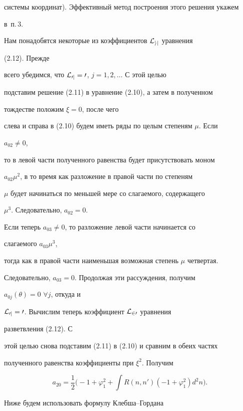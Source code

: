системы координат). Эффективный метод построения этого решения укажем


в~п.\,3.





Нам понадобятся некоторые из коэффициентов $\cal L_{ij}$ уравнения


(2.12). Прежде


всего убедимся, что $\cal L_{0j}=0$, $j=1,2,\dotsc$ С этой целью


подставим решение (2.11) в уравнение (2.10), а затем в полученном


тождестве положим $\xi=0$, после чего


слева и справа в (2.10) будем иметь ряды по целым степеням $\mu$. Если


$a_{02}\ne 0$,


то в левой части полученного равенства будет присутствовать моном


$a_{02}\mu^2$, в то время как разложение в правой части по степеням


$\mu$ будет начинаться по меньшей мере со слагаемого, содержащего


$\mu^3$. Следовательно, $a_{02}=0$.


Если теперь $a_{03}\ne 0$, то разложение левой части начинается со


слагаемого $a_{03}\mu^3$,


тогда как в правой части наименьшая возможная степень $\mu$ четвертая.


Следовательно, $a_{03}=0$. Продолжая эти рассуждения, получим


$a_{0j}(\theta)=0$ $\forall j$, откуда и


$\cal L_{0j}=0$. Вычислим теперь коэффициент $\cal L_{20}$ уравнения


разветвления (2.12). С


этой целью снова подставим (2.11) в (2.10) и сравним в обеих частях


полученного равенства коэффициенты при $\xi^2$. Получим


\begin{equation}


a_{20}=\frac{1}{2}\biggl(-1+\varphi^2_1+\int


R(n,n')(-1+\varphi^2_1)d^2n\biggr).


\tag{2.13}


\end{equation}


Ниже будем использовать формулу Клебша--Гордана \cite{4}


